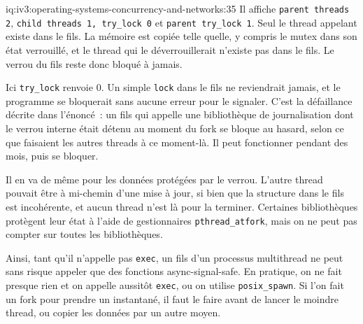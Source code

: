 \begin{solution}{iq:iv3:operating-systems-concurrency-and-networks:35}
Il affiche \texttt{parent threads 2}, \texttt{child threads 1, try\_lock 0} et \texttt{parent try\_lock 1}. Seul le thread appelant existe dans le fils. La mémoire est copiée telle quelle, y compris le mutex dans son état verrouillé, et le thread qui le déverrouillerait n'existe pas dans le fils. Le verrou du fils reste donc bloqué à jamais.

Ici \texttt{try\_lock} renvoie 0. Un simple \texttt{lock} dans le fils ne reviendrait jamais, et le programme se bloquerait sans aucune erreur pour le signaler. C'est la défaillance décrite dans l'énoncé~: un fils qui appelle une bibliothèque de journalisation dont le verrou interne était détenu au moment du fork se bloque au hasard, selon ce que faisaient les autres threads à ce moment-là. Il peut fonctionner pendant des mois, puis se bloquer.

Il en va de même pour les données protégées par le verrou. L'autre thread pouvait être à mi-chemin d'une mise à jour, si bien que la structure dans le fils est incohérente, et aucun thread n'est là pour la terminer. Certaines bibliothèques protègent leur état à l'aide de gestionnaires \texttt{pthread\_atfork}, mais on ne peut pas compter sur toutes les bibliothèques.

Ainsi, tant qu'il n'appelle pas \texttt{exec}, un fils d'un processus multithread ne peut sans risque appeler que des fonctions async-signal-safe. En pratique, on ne fait presque rien et on appelle aussitôt \texttt{exec}, ou on utilise \texttt{posix\_spawn}. Si l'on fait un fork pour prendre un instantané, il faut le faire avant de lancer le moindre thread, ou copier les données par un autre moyen.

\end{solution}

